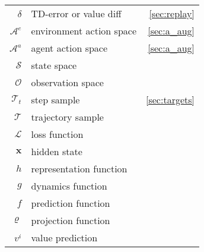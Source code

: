 \begin{tabular}{| r  l  r |}
    $\delta$        & TD-error or value diff                 & \ref{sec:replay}                         \\
    $\mathcal{A}^e$ & environment action space               & \ref{sec:a_aug}                          \\
    $\mathcal{A}^a$ & agent action space                     & \ref{sec:a_aug}                          \\
    $\mathcal{S}$   & state space                                                                       \\
    $\mathcal{O}$   & observation space                                                                 \\
    $\mathcal{T}_t$ & step sample                            & \ref{sec:targets}                        \\
    $\mathcal{T}$   & trajectory sample                                                                 \\
    $\mathcal{L}$   & loss function                                                                     \\

    \hline
    $\mathbf{x}$    & hidden state                                                                      \\
    $h$             & representation function                                                           \\
    $g$             & dynamics function                                                                 \\
    $f$             & prediction function                                                               \\
    $\varrho$       & projection function                                                               \\
    $v^i$           & value prediction                                                                  \\


\end{tabular}
